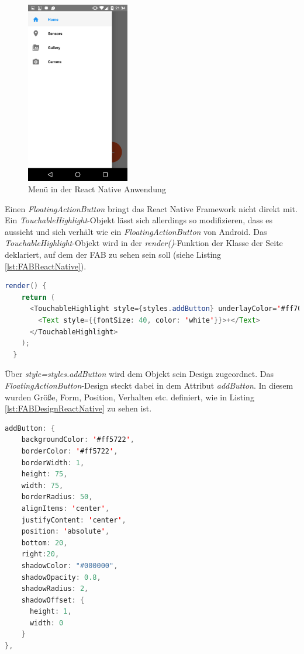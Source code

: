 \begin{figure}[h]
	\centering
	\includegraphics[width=0.4\textwidth]{Bilder/Screenshot_20170412-213445.PNG}
	\caption{Menü in der React Native Anwendung}
	\label{fig:MenuReactNative}
\end{figure}
\clearpage

Einen \textit{FloatingActionButton} bringt das React Native Framework nicht direkt mit. Ein \textit{TouchableHighlight}-Objekt lässt sich allerdings so modifizieren, dass es aussieht und sich verhält wie ein \textit{FloatingActionButton} von Android. Das \textit{TouchableHighlight}-Objekt wird in der \textit{render()}-Funktion der Klasse der Seite deklariert, auf dem der FAB zu sehen sein soll (siehe Listing \ref{lst:FABReactNative}). 

\begin{lstlisting}[caption=Deklaration eines \textit{TouchableHighlight}-Objekts als \textit{FloatingActionButton}, label=lst:FABReactNative, language=Java]
render() {
    return (
      <TouchableHighlight style={styles.addButton} underlayColor='#ff7043' onPress={() => this.props.navigation.navigate('Camera')}>
        <Text style={{fontSize: 40, color: 'white'}}>+</Text>
      </TouchableHighlight>
    );
  }
\end{lstlisting}

Über \textit{style=styles.addButton} wird dem Objekt sein Design zugeordnet. Das \textit{FloatingActionButton}-Design steckt dabei in dem Attribut \textit{addButton}. In diesem wurden Größe, Form, Position, Verhalten etc. definiert, wie in Listing \ref{lst:FABDesignReactNative} zu sehen ist.

\begin{lstlisting}[caption=Das \textit{FloatingActionButton}-Design, label=lst:FABDesignReactNative, language=Java]
addButton: {
    backgroundColor: '#ff5722',
    borderColor: '#ff5722',
    borderWidth: 1,
    height: 75,
    width: 75,
    borderRadius: 50,
    alignItems: 'center',
    justifyContent: 'center',
    position: 'absolute',
    bottom: 20,
    right:20,
    shadowColor: "#000000",
    shadowOpacity: 0.8,
    shadowRadius: 2,
    shadowOffset: {
      height: 1,
      width: 0
    }
},
\end{lstlisting} 

